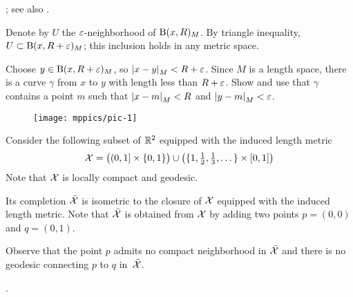  \cite[Corollary]{hu-kirk}; see also \cite[Lemma 2.3]{petrunin-stadler}.

Denote by $U$ the $\varepsilon$-neighborhood of $\mathrm{B}{}(x,R)_M$.
By triangle inequality, $U\subset \mathrm{B}{}(x,R+\varepsilon)_M$;
this inclusion holds in any metric space.

Choose $y\in \mathrm{B}{}(x,R+\varepsilon)_M$, so $\dist{x}{y}{M}<R+\eps$.
Since $M$ is a length space, there is a curve $\gamma$ from $x$ to $y$ with length less than $R+\varepsilon$.
Show and use that $\gamma$ contains a point $m$ such that $\dist{x}{m}{M}<R$ and $\dist{y}{m}{M}<\eps$.


\begin{wrapfigure}{r}{20 mm}
\vskip-6mm
\centering
\texttt{[image: mppics/pic-1]}
\end{wrapfigure}

Consider the following subset of $\mathbb{R}^2$ equipped with the induced length metric
\[
\mathcal{X}
=
\bigl((0,1]\times\{0,1\}\bigr)
\cup
\bigl(\{1,\tfrac12,\tfrac13,\dots\}\times[0,1]\bigr)
\]
Note that $\mathcal{X}$ is locally compact and geodesic.

Its completion $\bar{\mathcal{X}}$ is isometric to the closure of $\mathcal{X}$ equipped with the induced length metric.
Note that $\bar{\mathcal{X}}$ is obtained from $\mathcal{X}$ by adding two points $p=(0,0)$ and $q=(0,1)$.

Observe that the point $p$ admits no compact neighborhood in $\bar{\mathcal{X}}$ 
and there is no geodesic connecting $p$ to $q$ in~$\bar{\mathcal{X}}$. 

 \cite[I.3.6(4)]{bridson-haefliger}.

